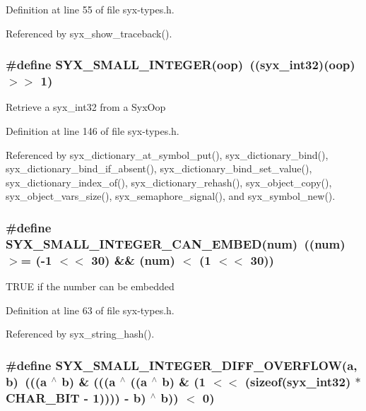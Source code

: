 Definition at line 55 of file syx-types.h.

Referenced by syx\_\-show\_\-traceback().\hypertarget{syx-types_8h_1776ff2dcc28f7ba6cb59366b5c741cc}{
\subsubsection{\setlength{\rightskip}{0pt plus 5cm}\#define SYX\_\-SMALL\_\-INTEGER(oop)~(({\bf syx\_\-int32})(oop) $>$$>$ 1)}}
\label{syx-types_8h_1776ff2dcc28f7ba6cb59366b5c741cc}


Retrieve a syx\_\-int32 from a SyxOop 

Definition at line 146 of file syx-types.h.

Referenced by syx\_\-dictionary\_\-at\_\-symbol\_\-put(), syx\_\-dictionary\_\-bind(), syx\_\-dictionary\_\-bind\_\-if\_\-absent(), syx\_\-dictionary\_\-bind\_\-set\_\-value(), syx\_\-dictionary\_\-index\_\-of(), syx\_\-dictionary\_\-rehash(), syx\_\-object\_\-copy(), syx\_\-object\_\-vars\_\-size(), syx\_\-semaphore\_\-signal(), and syx\_\-symbol\_\-new().\hypertarget{syx-types_8h_d51ca7a68a6122d41d94b97807b4b0d0}{
\subsubsection{\setlength{\rightskip}{0pt plus 5cm}\#define SYX\_\-SMALL\_\-INTEGER\_\-CAN\_\-EMBED(num)~((num) $>$= (-1 $<$$<$ 30) \&\& (num) $<$ (1 $<$$<$ 30))}}
\label{syx-types_8h_d51ca7a68a6122d41d94b97807b4b0d0}


TRUE if the number can be embedded 

Definition at line 63 of file syx-types.h.

Referenced by syx\_\-string\_\-hash().\hypertarget{syx-types_8h_8340970f9f58f4f659e4b88649757fc2}{
\subsubsection{\setlength{\rightskip}{0pt plus 5cm}\#define SYX\_\-SMALL\_\-INTEGER\_\-DIFF\_\-OVERFLOW(a, \/  b)~(((a $^\wedge$ b) \& (((a $^\wedge$ ((a $^\wedge$ b) \& (1 $<$$<$ (sizeof({\bf syx\_\-int32}) $\ast$ CHAR\_\-BIT - 1)))) - b) $^\wedge$ b)) $<$ 0)}}
\label{syx-types_8h_8340970f9f58f4f659e4b88649757fc2}


